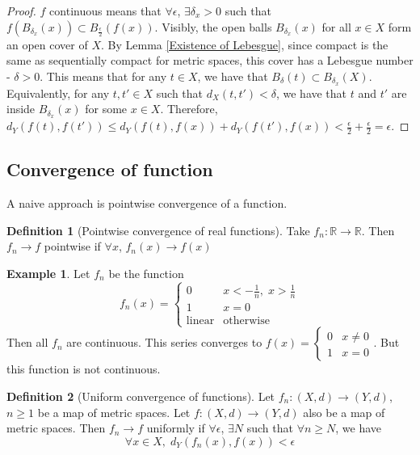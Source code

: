 \documentclass{article}
\theoremstyle{definition}
\newtheorem{defn}{Definition}[section]
\newtheorem{exmp}{Example}[section]
\theoremstyle{plain}%
\theoremstyle{remark}
\newcommand{\R}{\mathbb{R}}
\begin{document}
\begin{proof}
    $f$ continuous means that $\forall \epsilon$, $\exists \delta_x > 0$ such that $f(B_{\delta_x}(x)) \subset B_{\frac{\epsilon}{2}}(f(x))$. Visibly, the open balls $B_{\delta_x}(x)$ for all $x \in X$ form an open cover of $X$. By Lemma \ref{Existence of Lebesgue}, since compact is the same as sequentially compact for metric spaces, this cover has a Lebesgue number - $\delta > 0$. This means that for any $t \in X$, we have that $B_{\delta}(t) \subset B_{\delta_x}(X)$. Equivalently, for any $t, t' \in X$ such that $d_X(t, t') < \delta$, we have that $t$ and $t'$ are inside $B_{\delta_x}(x)$ for some $x \in X$. Therefore, $d_Y(f(t), f(t')) \le d_Y(f(t), f(x)) + d_Y(f(t'), f(x)) < \frac{\epsilon}{2} + \frac{\epsilon}{2} = \epsilon$.
\end{proof}

\subsection{Convergence of function}

A naive approach is pointwise convergence of a function.

\begin{defn}[Pointwise convergence of real functions]
    Take $f_n : \R \to \R$. Then $f_n \to f$ pointwise if $\forall x$, $f_n(x) \to f(x)$
\end{defn}

\begin{exmp}
    Let $f_n$ be the function
    \[f_n (x) = \begin{cases} 0 &x < -\frac{1}{n}, \; x > \frac{1}{n} \\ 1 &x=0 \\ \text{linear} &\text{otherwise} \end{cases}\]
    Then all $f_n$ are continuous. This series converges to $f(x) = \begin{cases} 0 &x \ne 0 \\ 1 &x=0 \end{cases}$. But this function is not continuous.
\end{exmp}

\begin{defn}[Uniform convergence of functions]
    Let $f_n : (X,d) \to (Y,d)$, $n \ge 1$ be a map of metric spaces. Let $f : (X,d) \to (Y,d)$ also be a map of metric spaces. Then $f_n \to f$ uniformly if $\forall \epsilon$, $\exists N$ such that $\forall n \ge N$, we have \[\forall x \in X, \; d_Y(f_n(x), f(x)) < \epsilon\]
\end{defn}
\end{document}
